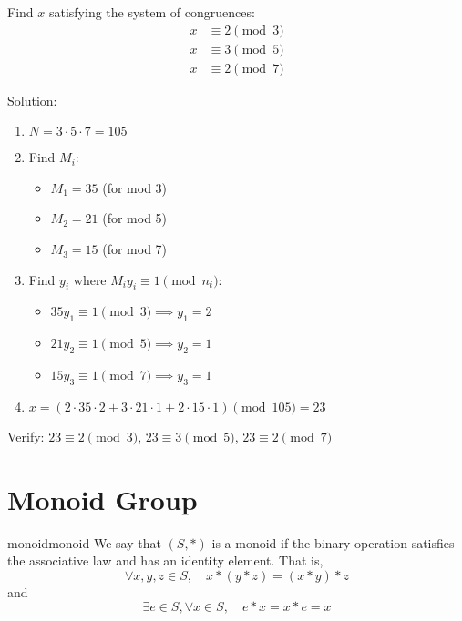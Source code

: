 \begin{example}
  Find $x$ satisfying the system of congruences:
  \begin{align*}
    x &\equiv 2 \pmod{3} \\
    x &\equiv 3 \pmod{5} \\
    x &\equiv 2 \pmod{7}
  \end{align*}

  Solution:
  \begin{enumerate}
    \item $N = 3 \cdot 5 \cdot 7 = 105$
    \item Find $M_i$:
      \begin{itemize}
        \item $M_1 = 35$ (for mod 3)
        \item $M_2 = 21$ (for mod 5)
        \item $M_3 = 15$ (for mod 7)
      \end{itemize}
    \item Find $y_i$ where $M_iy_i \equiv 1 \pmod{n_i}$:
      \begin{itemize}
        \item $35y_1 \equiv 1 \pmod{3} \implies y_1 = 2$
        \item $21y_2 \equiv 1 \pmod{5} \implies y_2 = 1$
        \item $15y_3 \equiv 1 \pmod{7} \implies y_3 = 1$
      \end{itemize}
    \item $x = (2 \cdot 35 \cdot 2 + 3 \cdot 21 \cdot 1 + 2 \cdot 15 \cdot 1) \pmod{105} = 23$
  \end{enumerate}

  Verify: $23 \equiv 2 \pmod{3}$, $23 \equiv 3 \pmod{5}$, $23 \equiv 2 \pmod{7}$
\end{example}

\section{Monoid Group}

\begin{definition}{monoid}{monoid}
  We say that $(S, \ast)$ is a monoid if the binary operation satisfies the associative law and has an identity element. That is,
  \[
    \forall x, y, z \in S, \quad x \ast (y \ast z) = (x \ast y) \ast z
  \]
  and
  \[
    \exists e \in S, \forall x \in S, \quad e \ast x = x \ast e = x
  \]
\end{definition}

